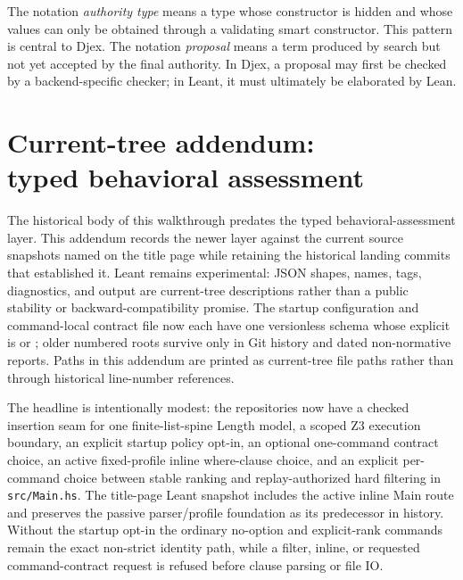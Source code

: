 \documentclass[10pt,letterpaper,oneside]{report}
\newcommand{\code}[1]{\texttt{\detokenize{#1}}}
\newcommand{\filepath}[1]{\nolinkurl{#1}}
\begin{document}
The notation \emph{authority type} means a type whose constructor is hidden and whose values can only be obtained through a validating smart constructor. This pattern is central to Djex. The notation \emph{proposal} means a term produced by search but not yet accepted by the final authority. In Djex, a proposal may first be checked by a backend-specific checker; in Leant, it must ultimately be elaborated by Lean.

\chapter*{Current-tree addendum:\\typed behavioral assessment}

The historical body of this walkthrough predates the typed behavioral-assessment layer. This addendum records the newer layer against the current source snapshots named on the title page while retaining the historical landing commits that established it. Leant remains experimental: JSON shapes, names, tags, diagnostics, and output are current-tree descriptions rather than a public stability or backward-compatibility promise. The startup configuration and command-local contract file now each have one versionless schema whose explicit \code{rankingDomain} is \code{scalar} or \code{binary-product}; older numbered roots survive only in Git history and dated non-normative reports. Paths in this addendum are printed as current-tree file paths rather than through historical line-number references.


  The headline is intentionally modest: the repositories now have a checked insertion seam for one finite-list-spine Length model, a scoped Z3 execution boundary, an explicit startup policy opt-in, an optional one-command contract choice, an active fixed-profile inline where-clause choice, and an explicit per-command choice between stable ranking and replay-authorized hard filtering in \filepath{src/Main.hs}. The title-page Leant snapshot includes the active inline Main route and preserves the passive parser/profile foundation as its predecessor in history. Without the startup opt-in the ordinary no-option and explicit-rank commands remain the exact non-strict identity path, while a filter, inline, or requested command-contract request is refused before clause parsing or file IO.
\end{document}
